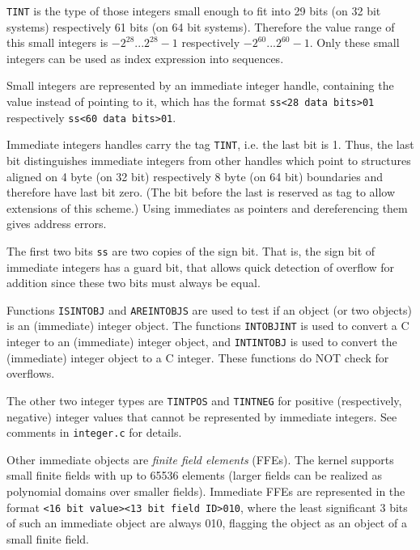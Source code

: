 \documentclass[a4paper,11pt]{report}
\begin{document}
{{{ \texttt{T{\textunderscore}INT} is the type of those integers small enough to fit into 29 bits (on 32 bit
systems) respectively 61 bits (on 64 bit systems). Therefore the value range
of this small integers is $-2^{28}...2^{28}-1$ respectively $-2^{60}...2^{60}-1$. Only these small integers can be used as index expression into sequences. 

 Small integers are represented by an immediate integer handle, containing the
value instead of pointing to it, which has the format \texttt{ss{\textless}28 data bits{\textgreater}01} respectively \texttt{ss{\textless}60 data bits{\textgreater}01}. 

 Immediate integers handles carry the tag \texttt{T{\textunderscore}INT}, i.e. the last bit is 1. Thus, the last bit distinguishes immediate integers
from other handles which point to structures aligned on 4 byte (on 32 bit)
respectively 8 byte (on 64 bit) boundaries and therefore have last bit zero.
(The bit before the last is reserved as tag to allow extensions of this
scheme.) Using immediates as pointers and dereferencing them gives address
errors. 

 The first two bits \texttt{ss} are two copies of the sign bit. That is, the sign bit of immediate integers
has a guard bit, that allows quick detection of overflow for addition since
these two bits must always be equal. 

 Functions \texttt{IS{\textunderscore}INTOBJ} and \texttt{ARE{\textunderscore}INTOBJS} are used to test if an object (or two objects) is an (immediate) integer
object. The functions \texttt{INTOBJ{\textunderscore}INT} is used to convert a \textsf{C} integer to an (immediate) integer object, and \texttt{INT{\textunderscore}INTOBJ} is used to convert the (immediate) integer object to a \textsf{C} integer. These functions do NOT check for overflows. 

 The other two integer types are \texttt{T{\textunderscore}INTPOS} and \texttt{T{\textunderscore}INTNEG} for positive (respectively, negative) integer values that cannot be
represented by immediate integers. See comments in \texttt{integer.c} for details. 

 Other immediate objects are \emph{finite field elements} (FFEs). The kernel supports small finite fields with up to 65536 elements
(larger fields can be realized as polynomial domains over smaller fields).
Immediate FFEs are represented in the format \texttt{{\textless}16 bit value{\textgreater}{\textless}13 bit field
ID{\textgreater}010}, where the least significant 3 bits of such an immediate object are always
010, flagging the object as an object of a small finite field. 

}}}
\end{document}
